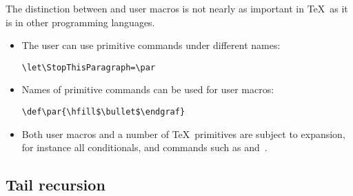 \documentclass[letterpaper]{book}
\begin{document}
%     
The distinction between  and user macros is not
nearly as important in \TeX\ as it is in other programming
languages.
\begin{itemize}
\item The user can use primitive commands under different names:
     
\begin{verbatim}
\let\StopThisParagraph=\par
\end{verbatim}
\item Names of primitive commands can be used for
      user macros:
\begin{verbatim}
\def\par{\hfill$\bullet$\endgraf}
\end{verbatim}
\item Both user macros and a number of \TeX\ primitives
      are subject to expansion, for instance all conditionals,
      and commands such as  and~.
\end{itemize}

\subsection{Tail recursion}
\end{document}

